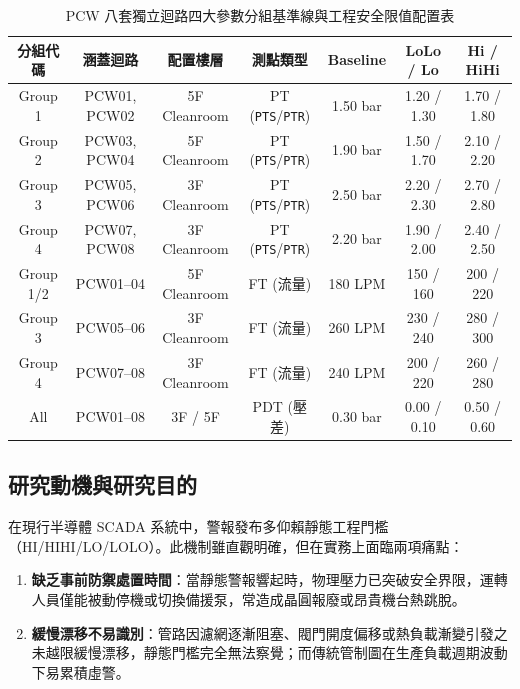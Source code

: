 \documentclass[fontset=none, a4paper, 12pt]{ctexart}
\begin{document}
\begin{doublespace}
\begin{table}[H]
\centering
\caption{PCW 八套獨立迴路四大參數分組基準線與工程安全限值配置表}
\label{tab:pcw_groups_v2}
\footnotesize
\renewcommand{\arraystretch}{1.15}
\setlength{\tabcolsep}{5pt}
\begin{tabularx}{0.98\textwidth}{ccccccc}
\toprule
\textbf{分組代碼} & \textbf{涵蓋迴路} & \textbf{配置樓層} & \textbf{測點類型} & \textbf{Baseline} & \textbf{LoLo / Lo} & \textbf{Hi / HiHi} \\
\midrule
Group 1 & PCW01, PCW02 & 5F Cleanroom & PT (\texttt{PTS}/\texttt{PTR}) & 1.50 bar & 1.20 / 1.30 & 1.70 / 1.80 \\
Group 2 & PCW03, PCW04 & 5F Cleanroom & PT (\texttt{PTS}/\texttt{PTR}) & 1.90 bar & 1.50 / 1.70 & 2.10 / 2.20 \\
Group 3 & PCW05, PCW06 & 3F Cleanroom & PT (\texttt{PTS}/\texttt{PTR}) & 2.50 bar & 2.20 / 2.30 & 2.70 / 2.80 \\
Group 4 & PCW07, PCW08 & 3F Cleanroom & PT (\texttt{PTS}/\texttt{PTR}) & 2.20 bar & 1.90 / 2.00 & 2.40 / 2.50 \\
\midrule
Group 1/2 & PCW01–04 & 5F Cleanroom & FT (流量) & 180 LPM & 150 / 160 & 200 / 220 \\
Group 3   & PCW05–06 & 3F Cleanroom & FT (流量) & 260 LPM & 230 / 240 & 280 / 300 \\
Group 4   & PCW07–08 & 3F Cleanroom & FT (流量) & 240 LPM & 200 / 220 & 260 / 280 \\
All       & PCW01–08 & 3F / 5F      & PDT (壓差) & 0.30 bar & 0.00 / 0.10 & 0.50 / 0.60 \\
\bottomrule
\end{tabularx}
\end{table}

\subsection{研究動機與研究目的}
在現行半導體 SCADA 系統中，警報發布多仰賴靜態工程門檻（HI/HIHI/LO/LOLO）。此機制雖直觀明確，但在實務上面臨兩項痛點：
\begin{enumerate}
    \item \textbf{缺乏事前防禦處置時間}：當靜態警報響起時，物理壓力已突破安全界限，運轉人員僅能被動停機或切換備援泵，常造成晶圓報廢或昂貴機台熱跳脫。
    \item \textbf{緩慢漂移不易識別}：管路因濾網逐漸阻塞、閥門開度偏移或熱負載漸變引發之未越限緩慢漂移，靜態門檻完全無法察覺；而傳統管制圖在生產負載週期波動下易累積虛警。
\end{enumerate}


\end{doublespace}
\end{document}
